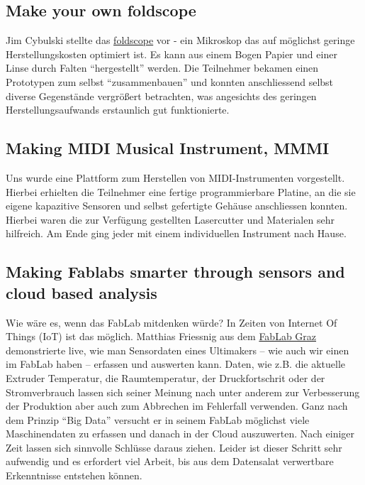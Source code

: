\documentclass{\basedir/fablab-document}
\begin{document}
\subsection*{Make your own foldscope}

Jim Cybulski stellte das \href{https://en.wikipedia.org/wiki/Foldscope}{foldscope}
vor - ein Mikroskop das auf
möglichst geringe Herstellungskosten optimiert ist. Es kann aus einem
Bogen Papier und einer Linse durch Falten ``hergestellt'' werden. Die
Teilnehmer bekamen einen Prototypen zum selbst ``zusammenbauen'' und
konnten anschliessend selbst diverse Gegenstände vergrößert betrachten,
was angesichts des geringen Herstellungsaufwands erstaunlich gut
funktionierte.

\subsection*{Making MIDI Musical Instrument, MMMI}

Uns wurde eine Plattform zum Herstellen von MIDI-Instrumenten
vorgestellt. Hierbei erhielten die Teilnehmer eine fertige
programmierbare Platine, an die sie eigene kapazitive Sensoren und
selbst gefertigte Gehäuse anschliessen konnten. Hierbei waren die zur
Verfügung gestellten Lasercutter und Materialen sehr hilfreich. Am Ende
ging jeder mit einem individuellen Instrument nach Hause.

\subsection*{Making Fablabs smarter through sensors and cloud based analysis}

Wie wäre es, wenn das FabLab mitdenken würde? In Zeiten von Internet Of
Things (IoT) ist das möglich. Matthias Friessnig aus dem
\href{http://fablab.tugraz.at/}{FabLab Graz} demonstrierte live, wie man
Sensordaten eines Ultimakers -- wie auch wir einen im FabLab haben --
erfassen und auswerten kann. Daten, wie z.B. die aktuelle Extruder
Temperatur, die Raumtemperatur, der Druckfortschrit oder der
Stromverbrauch lassen sich seiner Meinung nach unter anderem zur
Verbesserung der Produktion aber auch zum Abbrechen im Fehlerfall
verwenden. Ganz nach dem Prinzip ``Big Data'' versucht er in seinem
FabLab möglichst viele Maschinendaten zu erfassen und danach in der
Cloud auszuwerten. Nach einiger Zeit lassen sich sinnvolle Schlüsse
daraus ziehen. Leider ist dieser Schritt sehr aufwendig und es erfordert
viel Arbeit, bis aus dem Datensalat verwertbare Erkenntnisse entstehen können.
\end{document}
